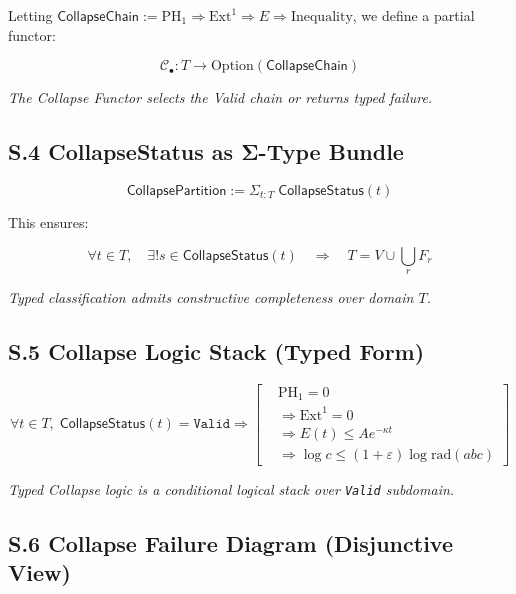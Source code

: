 \documentclass[11pt]{article}
\begin{document}
\noindent
Letting \( \mathsf{CollapseChain} := \mathrm{PH}_1 \Rightarrow \mathrm{Ext}^1 \Rightarrow E \Rightarrow \text{Inequality} \),  
we define a partial functor:

\[
\mathcal{C}_\bullet : T \longrightarrow \mathrm{Option}(\mathsf{CollapseChain})
\]

\begin{center}
\textit{The Collapse Functor selects the Valid chain or returns typed failure.}
\end{center}

\subsection*{S.4 CollapseStatus as Σ-Type Bundle}

\[
\mathsf{CollapsePartition} := \Sigma_{t:T} \; \mathsf{CollapseStatus}(t)
\]

This ensures:

\[
\forall t \in T, \quad \exists! s \in \mathsf{CollapseStatus}(t)
\quad \Rightarrow \quad T = V \cup \bigcup_r F_r
\]

\begin{center}
\textit{Typed classification admits constructive completeness over domain \( T \).}
\end{center}

\subsection*{S.5 Collapse Logic Stack (Typed Form)}

\[
\boxed{
\forall t \in T,\;
\mathsf{CollapseStatus}(t) = \texttt{Valid}
\Rightarrow
\left[
\begin{aligned}
& \mathrm{PH}_1 = 0 \\
& \Rightarrow \mathrm{Ext}^1 = 0 \\
& \Rightarrow E(t) \leq Ae^{-\kappa t} \\
& \Rightarrow \log c \leq (1+\varepsilon)\log \mathrm{rad}(abc)
\end{aligned}
\right]
}
\]

\begin{center}
\textit{Typed Collapse logic is a conditional logical stack over \texttt{Valid} subdomain.}
\end{center}

\subsection*{S.6 Collapse Failure Diagram (Disjunctive View)}
\end{document}
